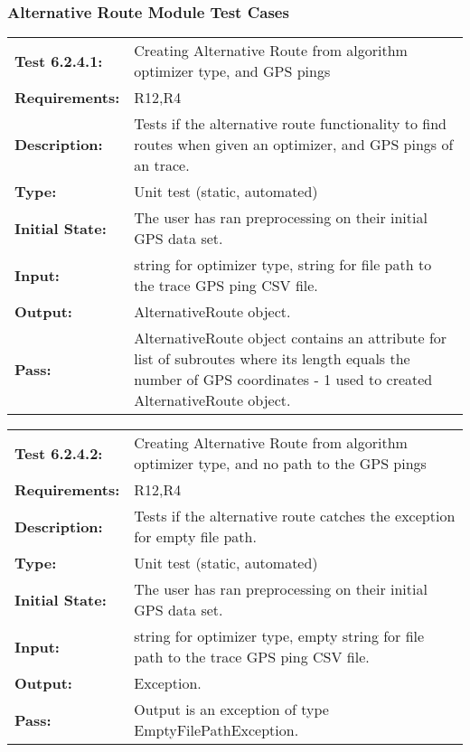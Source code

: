 \documentclass[12pt, titlepage]{article}
\begin{document}
{\subsubsection{Alternative Route Module Test Cases}
\begin{tabular}{|l|p{10cm}|}
    \hline
    \bf{Test} 6.2.4.1: & Creating Alternative Route from algorithm optimizer type, and GPS pings \\
    \bf{Requirements}: & R12,R4 \\
    \bf{Description}: & Tests if the alternative route functionality to find routes when given an optimizer, and GPS pings of an trace. \\
    \bf{Type}: & Unit test (static, automated) \\
    \bf{Initial State}: & The user has ran preprocessing on their initial GPS data set. \\
    \bf{Input}: & string for optimizer type, string for file path to the trace GPS ping CSV file. \\
    \bf{Output}: & AlternativeRoute object. \\
    \bf{Pass}: & AlternativeRoute object contains an attribute for list of subroutes where its length equals the number of GPS coordinates - 1 used to created AlternativeRoute object. \\
    \hline
\end{tabular}
\begin{tabular}{|l|p{10cm}|}
    \hline
    \bf{Test} 6.2.4.2: & Creating Alternative Route from algorithm optimizer type, and no path to the GPS pings \\
    \bf{Requirements}: & R12,R4 \\
    \bf{Description}: & Tests if the alternative route catches the exception for empty file path. \\
    \bf{Type}: & Unit test (static, automated) \\
    \bf{Initial State}: & The user has ran preprocessing on their initial GPS data set. \\
    \bf{Input}: & string for optimizer type, empty string for file path to the trace GPS ping CSV file. \\
    \bf{Output}: & Exception. \\
    \bf{Pass}: & Output is an exception of type EmptyFilePathException. \\
    \hline
\end{tabular}
}
\end{document}
